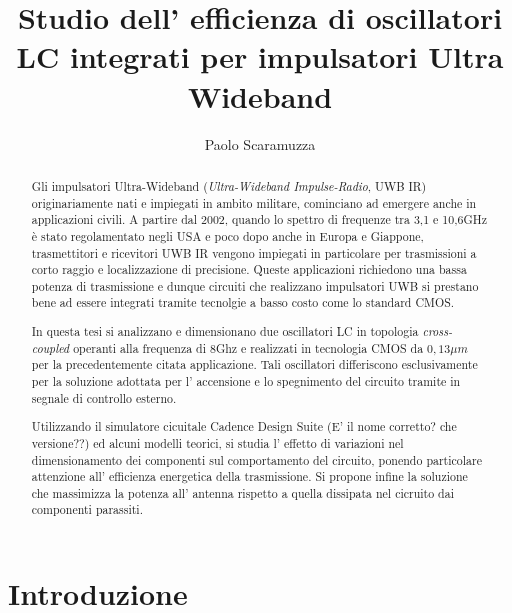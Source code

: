 \documentclass[a4paper]{memoir}
\author{Paolo Scaramuzza}
\title{Studio dell' efficienza di oscillatori LC integrati per impulsatori 
	Ultra Wideband}
\date{} %
\begin{document}
\cleardoublepage{}
\newpage

\begin{vplace}[0.7]
\begin{abstract}
Gli impulsatori Ultra-Wideband (\emph{Ultra-Wideband Impulse-Radio}, UWB IR)
originariamente nati e impiegati in ambito militare, cominciano ad emergere
anche in applicazioni civili.
A partire dal 2002, quando lo spettro di frequenze tra 3,1 e 10,6GHz è stato
regolamentato negli USA e poco dopo anche in Europa e Giappone, trasmettitori
e ricevitori UWB IR vengono impiegati in particolare per trasmissioni a corto
raggio e localizzazione di precisione.
Queste applicazioni richiedono una bassa potenza di trasmissione e dunque
circuiti che realizzano impulsatori UWB si prestano bene ad essere integrati
tramite tecnolgie a basso costo come lo standard CMOS.\@

In questa tesi si analizzano e dimensionano due oscillatori LC in topologia
\emph{cross-coupled} operanti alla frequenza di 8Ghz e realizzati in tecnologia
CMOS da $0,13 \mu m$ per la precedentemente citata applicazione.
Tali oscillatori differiscono esclusivamente per la soluzione adottata per l'
accensione e lo spegnimento del circuito tramite in segnale di controllo
esterno.

Utilizzando il simulatore cicuitale Cadence Design Suite (E' il nome corretto?
che versione??) ed alcuni modelli teorici, si studia l' effetto di variazioni
nel dimensionamento dei componenti sul comportamento del circuito, ponendo
particolare attenzione all' efficienza energetica della trasmissione.
Si propone infine la soluzione che massimizza la potenza all' antenna rispetto
a quella dissipata nel cicruito dai componenti parassiti.
\end{abstract}
\end{vplace}

\cleardoublepage{}
\newpage
\tableofcontents

\cleardoublepage{}
\chapter{Introduzione}
\end{document}
